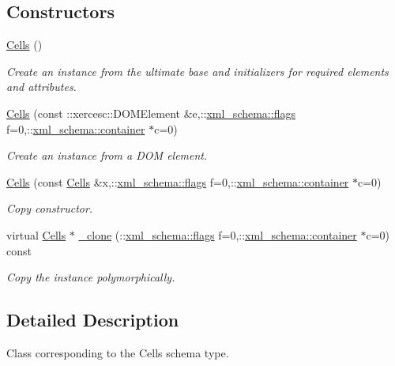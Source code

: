 \subsection*{Constructors}
\begin{DoxyCompactItemize}
\item 
\hyperlink{classCells_a092d62bc15648a54755a413dbf9a2db0}{Cells} ()
\begin{DoxyCompactList}\small\item\em Create an instance from the ultimate base and initializers for required elements and attributes. \end{DoxyCompactList}\item 
\hyperlink{classCells_a79e3031094d928c8d275198201d44f0c}{Cells} (const \-::xercesc\-::\-D\-O\-M\-Element \&e,\-::\hyperlink{namespacexml__schema_a8d981c127a1f5106d04ad5853e707361}{xml\-\_\-schema\-::flags} f=0,\-::\hyperlink{namespacexml__schema_a395f5179c5fc4643909d66e9ff28d8ca}{xml\-\_\-schema\-::container} $\ast$c=0)
\begin{DoxyCompactList}\small\item\em Create an instance from a D\-O\-M element. \end{DoxyCompactList}\item 
\hyperlink{classCells_a9322653263fb302eb7068be10b1b364f}{Cells} (const \hyperlink{classCells}{Cells} \&x,\-::\hyperlink{namespacexml__schema_a8d981c127a1f5106d04ad5853e707361}{xml\-\_\-schema\-::flags} f=0,\-::\hyperlink{namespacexml__schema_a395f5179c5fc4643909d66e9ff28d8ca}{xml\-\_\-schema\-::container} $\ast$c=0)
\begin{DoxyCompactList}\small\item\em Copy constructor. \end{DoxyCompactList}\item 
virtual \hyperlink{classCells}{Cells} $\ast$ \hyperlink{classCells_a67e7fa1cc404dcc4814011ca179f8a83}{\-\_\-clone} (\-::\hyperlink{namespacexml__schema_a8d981c127a1f5106d04ad5853e707361}{xml\-\_\-schema\-::flags} f=0,\-::\hyperlink{namespacexml__schema_a395f5179c5fc4643909d66e9ff28d8ca}{xml\-\_\-schema\-::container} $\ast$c=0) const 
\begin{DoxyCompactList}\small\item\em Copy the instance polymorphically. \end{DoxyCompactList}\end{DoxyCompactItemize}


\subsection{Detailed Description}
Class corresponding to the Cells schema type. 

